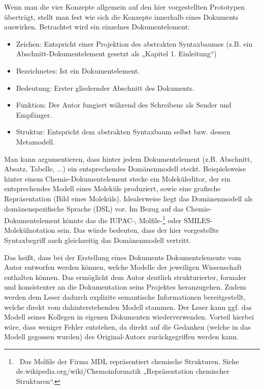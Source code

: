  
Wenn man die vier Konzepte allgemein auf den hier vorgestellten Prototypen überträgt, stellt man fest wie sich die Konzepte innerhalb eines Dokuments auswirken. Betrachtet wird ein einzelnes Dokumentelement:

 
\begin{itemize}

\item Zeichen: Entspricht einer Projektion des abstrakten Syntaxbaumes (z.B. ein Abschnitt-Dokumentelement gesetzt als „Kapitel 1. Einleitung“)
\item Bezeichnetes: Ist ein Dokumentelement.
\item Bedeutung: Erster gliedernder Abschnitt des Dokuments.
\item Funktion: Der Autor fungiert während des Schreibens als Sender und Empfänger.
\item Struktur: Entspricht dem abstrakten Syntaxbaum selbst bzw. dessen Metamodell.
\end{itemize}
 
Man kann argumentieren, dass hinter jedem Dokumentelement (z.B. Abschnitt, Absatz, Tabelle, ...) ein entsprechendes Domänenmodell steckt. Beispielsweise hinter einem Chemie-Dokumentelement stecke ein Moleküleditor, der ein entsprechendes Modell eines Moleküls produziert, sowie eine grafische Repräsentation (Bild eines Moleküls). Idealerweise liegt das Domänenmodell als domänenspezifische Sprache (DSL) vor. Im Bezug auf das Chemie-Dokumentelement könnte das die IUPAC-, Molfile-\footnote{~Das Molfile der Firma MDL repräsentiert chemische Strukturen. Siehe de.wikipedia.org/wiki/Chemoinformatik „Repräsentation chemischer Strukturen“.} oder SMILES-Molekülnotation sein. Das würde bedeuten, dass der hier vorgestellte Syntaxbegriff auch gleichzeitig das Domänenmodell vertritt.

 
Das heißt, dass bei der Erstellung eines Dokuments Dokumentelemente vom Autor entworfen werden können, welche Modelle der jeweiligen Wissenschaft enthalten können. Das ermöglicht dem Autor deutlich strukturierter, formaler und konsistenter an die Dokumentation seins Projektes heranzugehen. Zudem werden dem Leser dadurch explizite semantische Informationen bereitgestellt, welche direkt vom dahinterstehenden Modell stammen. Der Leser kann ggf. das Modell seines Kollegen in eigenen Dokumenten wiederverwenden. Vorteil hierbei wäre, dass weniger Fehler entstehen, da direkt auf die Gedanken (welche in das Modell gegossen wurden) des Original-Autors zurückgegriffen werden kann.

